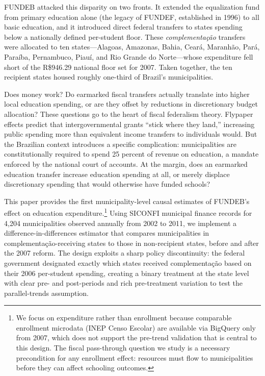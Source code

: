 \documentclass[12pt]{article}
\begin{document}
FUNDEB attacked this disparity on two fronts. It extended the equalization fund from
primary education alone (the legacy of FUNDEF, established in 1996) to all basic
education, and it introduced direct federal transfers to states spending below a
nationally defined per-student floor. These \textit{complementa\c{c}\~ao} transfers
were allocated to ten states---Alagoas, Amazonas, Bahia, Cear\'a, Maranh\~ao, Par\'a,
Para\'iba, Pernambuco, Piau\'i, and Rio Grande do Norte---whose expenditure fell short
of the R\$946.29 national floor set for 2007. Taken together, the ten recipient states
housed roughly one-third of Brazil's municipalities.

Does money work? Do earmarked fiscal transfers actually translate into higher local
education spending, or are they offset by reductions in discretionary budget allocation?
These questions go to the heart of fiscal federalism theory. Flypaper effects
\citep{hines1995} predict that intergovernmental grants ``stick where they land,''
increasing public spending more than equivalent income transfers to individuals would.
But the Brazilian context introduces a specific complication: municipalities are
constitutionally required to spend 25 percent of revenue on education, a mandate
enforced by the national court of accounts. At the margin, does an earmarked education
transfer increase education spending at all, or merely displace discretionary spending
that would otherwise have funded schools?

This paper provides the first municipality-level causal estimates of FUNDEB's effect
on education expenditure.\footnote{We focus on expenditure rather than enrollment because
comparable enrollment microdata (INEP Censo Escolar) are available via BigQuery only
from 2007, which does not support the pre-trend validation that is central to this design.
The fiscal pass-through question we study is a necessary precondition for any enrollment
effect: resources must flow to municipalities before they can affect schooling outcomes.}
Using SICONFI municipal finance records for 4,204 municipalities
observed annually from 2002 to 2011, we implement a difference-in-differences estimator
that compares municipalities in complementa\c{c}\~ao-receiving states to those in
non-recipient states, before and after the 2007 reform. The design exploits a sharp
policy discontinuity: the federal government designated exactly which states received
complementa\c{c}\~ao based on their 2006 per-student spending, creating a binary
treatment at the state level with clear pre- and post-periods and rich pre-treatment
variation to test the parallel-trends assumption.
\end{document}

